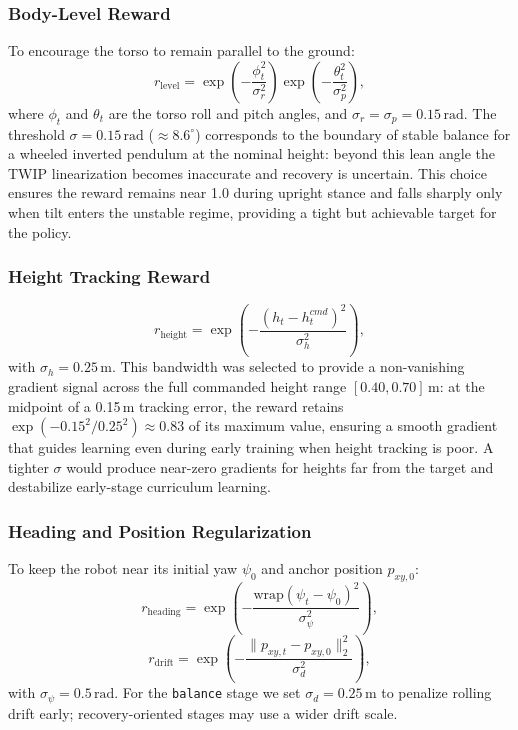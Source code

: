 \documentclass[conference]{IEEEtran}
\begin{document}
\subsubsection{Body-Level Reward}
To encourage the torso to remain parallel to the ground:
\begin{equation}
r_{\mathrm{level}} =
\exp\!\left(-\frac{\phi_t^2}{\sigma_r^2}\right)
\exp\!\left(-\frac{\theta_t^2}{\sigma_p^2}\right),
\label{eq:body_level}
\end{equation}
where $\phi_t$ and $\theta_t$ are the torso roll and pitch angles,
and $\sigma_r = \sigma_p = 0.15\,\mathrm{rad}$.
The threshold $\sigma = 0.15\,\mathrm{rad}$ ($\approx8.6^\circ$) corresponds
to the boundary of stable balance for a wheeled inverted pendulum at the
nominal height: beyond this lean angle the TWIP linearization becomes
inaccurate and recovery is uncertain.
This choice ensures the reward remains near 1.0 during upright stance
and falls sharply only when tilt enters the unstable regime,
providing a tight but achievable target for the policy.

\subsubsection{Height Tracking Reward}
\begin{equation}
r_{\mathrm{height}} =
\exp\!\left(
-\frac{(h_t - h_t^{cmd})^2}{\sigma_h^2}
\right),
\label{eq:height_reward}
\end{equation}
with $\sigma_h = 0.25\,\mathrm{m}$.
This bandwidth was selected to provide a non-vanishing gradient signal
across the full commanded height range $[0.40, 0.70]\,\mathrm{m}$:
at the midpoint of a 0.15\,m tracking error, the reward retains
$\exp(-0.15^2/0.25^2) \approx 0.83$ of its maximum value,
ensuring a smooth gradient that guides learning even during early training
when height tracking is poor.
A tighter $\sigma$ would produce near-zero gradients for heights far from
the target and destabilize early-stage curriculum learning.

\subsubsection{Heading and Position Regularization}
To keep the robot near its initial yaw $\psi_0$ and anchor
position $p_{xy,0}$:
\begin{equation}
r_{\mathrm{heading}} =
\exp\!\left(
-\frac{\mathrm{wrap}(\psi_t - \psi_0)^2}{\sigma_\psi^2}
\right),
\label{eq:heading_reward}
\end{equation}
\begin{equation}
r_{\mathrm{drift}} =
\exp\!\left(
-\frac{\|p_{xy,t} - p_{xy,0}\|_2^2}{\sigma_d^2}
\right),
\label{eq:drift_reward}
\end{equation}
with $\sigma_\psi = 0.5\,\mathrm{rad}$.
For the \texttt{balance} stage we set $\sigma_d = 0.25\,\mathrm{m}$
to penalize rolling drift early; recovery-oriented stages may use a
wider drift scale.
\end{document}
